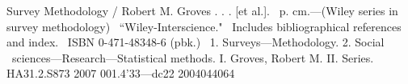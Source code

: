 Survey Methodology / Robert M. Groves . . . [et al.].
\       p. cm.---(Wiley series in survey methodology)
\    ``Wiley-Interscience."
\    Includes bibliographical references and index.
\    ISBN 0-471-48348-6 (pbk.)
\    1. Surveys---Methodology.  2. Social 
\  sciences---Research---Statistical methods.  I. Groves, Robert M.  II. %
Series.\\

HA31.2.S873 2007
001.4'33---dc22                                             2004044064